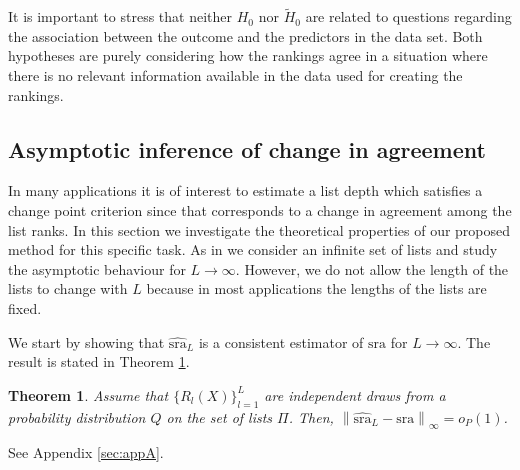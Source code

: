\documentclass[12pt,a4paper]{article}
\DeclareMathOperator{\E}{\mathbb{E}}
\theoremstyle{plain}
\newtheorem{theorem}{Theorem}
\newtheorem{assumption}{Assumption}
\begin{document}
It is important to stress that neither $H_0$ nor $\widetilde H_0$ are
related to questions regarding the association between the outcome and
the predictors in the data set. Both hypotheses are purely considering
how the rankings agree in a situation where there is no relevant
information available in the data used for creating the rankings.


\subsection{Asymptotic inference of change in agreement}\label{sec:chgpoint}
In many applications it is of interest to estimate a list depth which
satisfies a change point criterion since that corresponds to a change
in agreement among the list ranks. In this section we investigate the
theoretical properties of our proposed method for this specific
task. As in \cite{hall:schi:2012} we consider an infinite set
of lists and study the asymptotic behaviour for $L\to\infty$.
However, we do not allow the length of the lists to change with $L$
because in most applications the lengths of the lists are fixed.

We start by showing that $\widehat{\textrm{sra}}_L$ is a consistent
estimator of $\textrm{sra}$ for $L \rightarrow \infty$. The result is
stated in Theorem \ref{thm:consistency}.


\begin{theorem}
  Assume that $\{R_l(X)\}_{l=1}^L$ are independent draws from a
  probability distribution $Q$ on the set of lists $\Pi$. Then,
  $\left\|\widehat{\textrm{sra}}_L - \textrm{sra}\right\|_\infty =
  o_P(1)$.
\label{thm:consistency}
\end{theorem}
\proof See Appendix \ref{sec:appA}.
\end{document}
